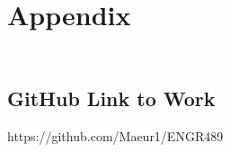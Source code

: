 \chapter{Appendix}\label{C:appendix}
\section{\\GitHub Link to Work}
https://github.com/Maeur1/ENGR489
